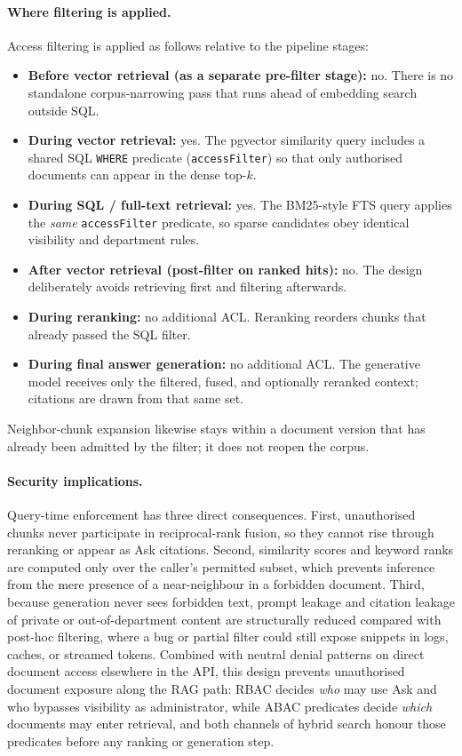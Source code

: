 \paragraph{Where filtering is applied.}
Access filtering is applied as follows relative to the pipeline stages:

\begin{itemize}
  \item \textbf{Before vector retrieval (as a separate pre-filter stage):}
        no. There is no standalone corpus-narrowing pass that runs ahead of
        embedding search outside SQL.
  \item \textbf{During vector retrieval:}
        yes. The pgvector similarity query includes a shared SQL
        \texttt{WHERE} predicate (\texttt{accessFilter}) so that only
        authorised documents can appear in the dense top-$k$.
  \item \textbf{During SQL / full-text retrieval:}
        yes. The BM25-style FTS query applies the \emph{same}
        \texttt{accessFilter} predicate, so sparse candidates obey identical
        visibility and department rules.
  \item \textbf{After vector retrieval (post-filter on ranked hits):}
        no. The design deliberately avoids retrieving first and filtering
        afterwards.
  \item \textbf{During reranking:}
        no additional ACL. Reranking reorders chunks that already passed the
        SQL filter.
  \item \textbf{During final answer generation:}
        no additional ACL. The generative model receives only the filtered,
        fused, and optionally reranked context; citations are drawn from that
        same set.
\end{itemize}

Neighbor-chunk expansion likewise stays within a document version that has
already been admitted by the filter; it does not reopen the corpus.

\paragraph{Security implications.}
Query-time enforcement has three direct consequences. First, unauthorised
chunks never participate in reciprocal-rank fusion, so they cannot rise through
reranking or appear as Ask citations. Second, similarity scores and keyword
ranks are computed only over the caller's permitted subset, which prevents
inference from the mere presence of a near-neighbour in a forbidden document.
Third, because generation never sees forbidden text, prompt leakage and
citation leakage of private or out-of-department content are structurally
reduced compared with post-hoc filtering, where a bug or partial filter could
still expose snippets in logs, caches, or streamed tokens. Combined with
neutral denial patterns on direct document access elsewhere in the API, this
design prevents unauthorised document exposure along the RAG path: RBAC decides
\emph{who} may use Ask and who bypasses visibility as administrator, while ABAC
predicates decide \emph{which} documents may enter retrieval, and both channels
of hybrid search honour those predicates before any ranking or generation step.

